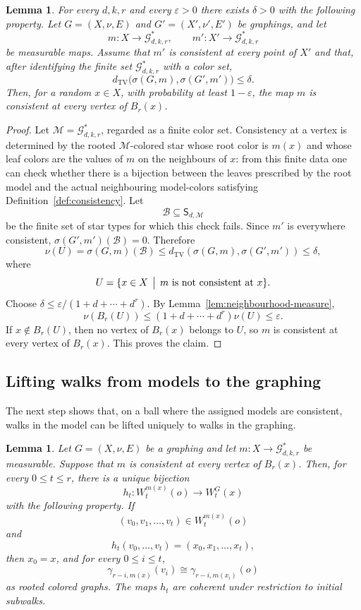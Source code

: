 \documentclass[11pt]{amsart}
\newcommand{\calG}{\mathcal G}
\newcommand{\TV}{\operatorname{TV}}
\newtheorem{lemma}[theorem]{Lemma}
\theoremstyle{remark}
\begin{document}
\begin{lemma}\label{lem:consistency-from-stars}
For every $d,k,r$ and every $\varepsilon>0$ there exists $\delta>0$ with the following property.  Let $G=(X,\nu,E)$ and $G'=(X',\nu',E')$ be graphings, and let
\[
 m\colon X\to\calG^*_{d,k,r},\qquad m'\colon X'\to\calG^*_{d,k,r}
\]
be measurable maps.  Assume that $m'$ is consistent at every point of $X'$ and that, after identifying the finite set $\calG^*_{d,k,r}$ with a color set,
\[
 d_{\TV}\bigl(\sigma(G,m),\sigma(G',m')\bigr)\leq\delta.
\]
Then, for a random $x\in X$, with probability at least $1-\varepsilon$, the map $m$ is consistent at every vertex of $B_r(x)$.
\end{lemma}

\begin{proof}
Let $\mathcal M=\calG^*_{d,k,r}$, regarded as a finite color set.  Consistency at a vertex is determined by the rooted $\mathcal M$-colored star whose root color is $m(x)$ and whose leaf colors are the values of $m$ on the neighbours of $x$: from this finite data one can check whether there is a bijection between the leaves prescribed by the root model and the actual neighbouring model-colors satisfying Definition~\ref{def:consistency}.  Let
\[
 \mathcal B\subseteq \mathsf S_{d,\mathcal M}
\]
be the finite set of star types for which this check fails.  Since $m'$ is everywhere consistent, $\sigma(G',m')(\mathcal B)=0$.  Therefore
\[
 \nu(U)=\sigma(G,m)(\mathcal B)\leq d_{\TV}(\sigma(G,m),\sigma(G',m'))\leq\delta,
\]
where
\[
 U=\{x\in X\,\bigm|\, m\text{ is not consistent at }x\}.
\]
Choose $\delta\leq \varepsilon/(1+d+\cdots+d^r)$.  By Lemma~\ref{lem:neighbourhood-measure},
\[
 \nu(B_r(U))\leq (1+d+\cdots+d^r)\nu(U)\leq\varepsilon.
\]
If $x\notin B_r(U)$, then no vertex of $B_r(x)$ belongs to $U$, so $m$ is consistent at every vertex of $B_r(x)$.  This proves the claim.
\end{proof}

\subsection{Lifting walks from models to the graphing}

The next step shows that, on a ball where the assigned models are consistent, walks in the model can be lifted uniquely to walks in the graphing.

\begin{lemma}\label{lem:walk-lifting}
Let $G=(X,\nu,E)$ be a graphing and let $m\colon X\to\calG^*_{d,k,r}$ be measurable.  Suppose that $m$ is consistent at every vertex of $B_r(x)$.  Then, for every $0\leq t\leq r$, there is a unique bijection
\[
 h_t\colon W_t^{m(x)}(o)\to W_t^G(x)
\]
with the following property.  If
\[
 (v_0,v_1,\ldots,v_t)\in W_t^{m(x)}(o)
\]
and
\[
 h_t(v_0,\ldots,v_t)=(x_0,x_1,\ldots,x_t),
\]
then $x_0=x$, and for every $0\leq i\leq t$,
\[
 \gamma_{r-i,m(x)}(v_i)\cong \gamma_{r-i,m(x_i)}(o)
\]
as rooted colored graphs.  The maps $h_t$ are coherent under restriction to initial subwalks.
\end{lemma}
\end{document}
